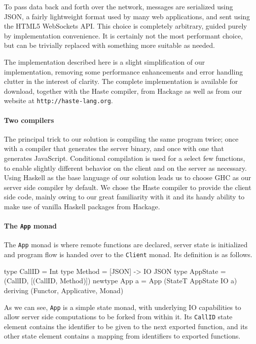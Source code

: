 \documentclass[preprint]{sigplanconf}
\begin{document}
To pass data back and forth over the network, messages are serialized using
JSON, a fairly lightweight format used by many web applications, and sent using
the HTML5 WebSockets API. This choice is completely arbitrary, guided purely
by implementation convenience. It is certainly not the most performant choice,
but can be trivially replaced with something more suitable as needed.

The implementation described here is a slight simplification of our
implementation, removing some performance enhancements and error handling
clutter in the interest of clarity. The complete implementation is available
for download, together with the Haste compiler, from Hackage as well as from
our website at \lstinline!http://haste-lang.org!.


\paragraph{Two compilers}
The principal trick to our solution is compiling the same program twice; once
with a compiler that generates the server binary, and once with one that
generates JavaScript. Conditional compilation is used for a select few
functions, to enable slightly different behavior on the client and on the
server as necessary. Using Haskell as the base language of our solution leads
us to choose GHC as our server side compiler by default. We chose the Haste
compiler to provide the client side code, mainly owing to our great familiarity
with it and its handy ability to make use of vanilla Haskell packages from
Hackage.

\paragraph{The \lstinline!App! monad}
The \lstinline!App! monad is where remote functions are declared, server state
is initialized and program flow is handed over to the \lstinline!Client! monad.
Its definition is as follows.

\begin{code}
type CallID = Int
type Method = [JSON] -> IO JSON
type AppState = (CallID, [(CallID, Method)])
newtype App a = App (StateT AppState IO a)
  deriving (Functor, Applicative, Monad)
\end{code}

As we can see, \lstinline!App! is a simple state monad, with underlying IO
capabilities to allow server side computations to be forked from within it.
Its \lstinline!CallID! state element contains the identifier to be given to the
next exported function, and its other state element contains a mapping from
identifiers to exported functions.
\end{document}
